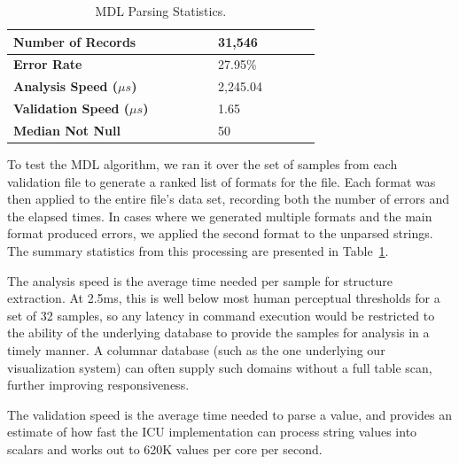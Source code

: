 \begin{table}[ht]
\centering
\bgroup
\def\arraystretch{1.5}
\begin{tabular}{|p{0.48\linewidth}| p{0.24\linewidth}|}
\hline
\textbf{Number of Records} & 31,546\\ \hline
\textbf{Error Rate} & 27.95\% \\ \hline
\textbf{Analysis Speed ($\mu s$)} & 2,245.04 \\ \hline
\textbf{Validation Speed ($\mu s$)} & 1.65 \\ \hline
\textbf{Median Not Null} & 50 \\ \hline
\end{tabular}
\egroup
\caption{MDL Parsing Statistics.}
\label{tab:mdlstats}
\end{table}

To test the MDL algorithm, we ran it over the set of samples from each validation file to generate a ranked list of formats for the file. Each format was then applied to the entire file's data set, recording both the number of errors and the elapsed times. In cases where we generated multiple formats and the main format produced errors, we applied the second format to the unparsed strings. The summary statistics from this processing are presented in Table~\ref{tab:mdlstats}.

The analysis speed is the average time needed per sample for structure extraction. At 2.5ms, this is well below most human perceptual thresholds for a set of 32 samples, so any latency in command execution would be restricted to the ability of the underlying database to provide the samples for analysis in a timely manner. A columnar database (such as the one underlying our visualization system) can often supply such domains without a full table scan, further improving responsiveness.

The validation speed is the average time needed to parse a value, and provides an estimate of how fast the ICU implementation can process string values into scalars and works out to 620K values per core per second.
 
